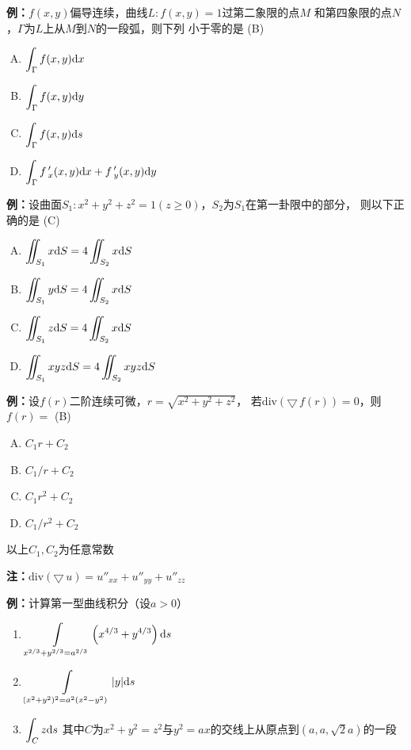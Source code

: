 {\bf 例：}$f(x,y)$偏导连续，曲线$L:f(x,y)=1$过第二象限的点$M$
  和第四象限的点$N$，$\Gamma$为$L$上从$M$到$N$的一段弧，则下列
  小于零的是\;
(B)
  \begin{enumerate}[(A)]
  \setlength{\itemindent}{1cm}
    \item $\displaystyle\int_{\Gamma}f(x,y)\mathrm{d} x$
    \item $\displaystyle\int_{\Gamma}f(x,y)\mathrm{d} y$
    \item $\displaystyle\int_{\Gamma}f(x,y)\mathrm{d} s$
    \item $\displaystyle\int_{\Gamma}f\,'_x(x,y)\mathrm{d} x+f\,'_y(x,y)\mathrm{d} y$
  \end{enumerate}

{\bf 例：}设曲面$S_1:x^2+y^2+z^2=1(z\geq
  0)$，$S_2$为$S_1$在第一卦限中的部分，
  则以下正确的是\;
  (C) 
  \begin{enumerate}[(A)]
  \setlength{\itemindent}{1cm}
    \item $\displaystyle\iint_{S_1}x\mathrm{d} S=4\iint_{S_2}x\mathrm{d} S$
    \item $\displaystyle\iint_{S_1}y\mathrm{d} S=4\iint_{S_2}x\mathrm{d} S$
    \item $\displaystyle\iint_{S_1}z\mathrm{d} S=4\iint_{S_2}x\mathrm{d} S$
    \item $\displaystyle\iint_{S_1}xyz\mathrm{d} S=4\iint_{S_2}xyz\mathrm{d} S$
  \end{enumerate}

{\bf 例：}设$f(r)$二阶连续可微，$r=\sqrt{x^2+y^2+z^2}$，
  若$\mathrm{div}(\bigtriangledown\,f(r))=0$，则$f(r)=$\;
  (B) 
  \begin{enumerate}[(A)]
  \setlength{\itemindent}{1cm}
    \item $C_1r+C_2$
    \item $C_1/r+C_2$
    \item $C_1r^2+C_2$
    \item $C_1/r^2+C_2$
  \end{enumerate}
  以上$C_1,C_2$为任意常数

{\bf 注：}$\mathrm{div}(\bigtriangledown\,u)=u''_{xx}+u''_{yy}+u''_{zz}$

{\bf 例：}计算第一型曲线积分（设$a>0$）
\begin{enumerate}[(1)]
  \setlength{\itemindent}{1cm}
  \item $\displaystyle\int\limits_{x^{2/3}+y^{2/3}=a^{2/3}}
  \left(x^{4/3}+y^{4/3}\right)\mathrm{d} s$
  \item $\displaystyle\int\limits_{(x^2+y^2)^2=a^2(x^2-y^2)}|y|\mathrm{d} s$
  \item $\displaystyle\int_Cz\mathrm{d} s$
  其中$C$为$x^2+y^2=z^2$与$y^2=ax$的交线上从原点到$(a,a,\sqrt2a)$的一段
\end{enumerate}

